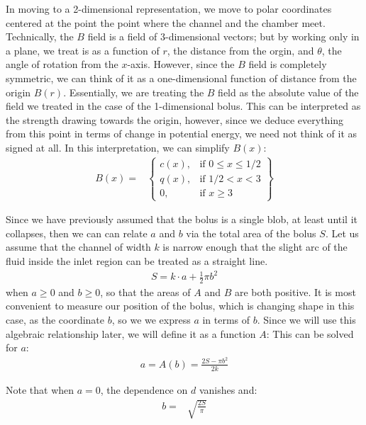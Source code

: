 \documentclass[]{asme2ej}
\begin{document}
In moving to a 2-dimensional representation, we move to polar coordinates
centered at the point the point where the channel and the chamber meet.
Technically, the $B$ field is a field of 3-dimensional vectors; but
by working only in a plane, we treat is as a function of $r$, the distance
from the orgin, and $\theta$, the angle of rotation from the $x$-axis. However,
since the $B$ field is completely symmetric, we can think of it as a one-dimensional
function of distance from the origin $B(r)$. Essentially, we are treating the
$B$ field as the absolute value of the field we treated in the case of the 1-dimensional
bolus.
This can be interpreted as the strength drawing towards the origin, however, since
we deduce everything from this point in terms of change in potential energy,
we need not think of it as signed at all.
In this interpretation, we can simplify $B(x)$:
\begin{align}
B(x) = &
\left\{
    \begin{array}{lr}
      c(x) , & \text{if } 0 \leq x \leq 1/2 \\
      q(x) , & \text{if } 1/2 < x < 3 \\
      0 , & \text{if } x \geq 3
    \end{array}
    \right\}
    \label{eq:Bfield}
\end{align}


Since we have previously assumed that the bolus is a single blob,
at least until it collapses, then we can can relate $a$ and $b$
via the total area of the bolus $S$.
Let us assume that the channel of width $k$ is narrow enough
that the slight arc of the fluid inside the inlet region can be treated as a
straight line.
\begin{align}
S = k \cdot a + \frac{1}{2} \pi b^2
\end{align}
when $a \geq 0$ and $b \geq 0$, so that the areas of $A$ and $B$ are both positive.
It is most convenient to measure our position of the bolus, which is
changing shape in this case, as the coordinate $b$, so we we express
$a$ in terms of $b$. Since we will use this algebraic relationship later, we will define it as a function $A$:
This can be solved for $a$:
\begin{align}
  a = A(b) = \frac{2S - \pi b^2}{2k}
  \label{eqn:afromS}
\end{align}


Note that when $a = 0$, the dependence on $d$ vanishes and:
\begin{align}
  b = & \sqrt{\frac{2S}{\pi}} \\
  \label{eq:maximalB}
\end{align}
\end{document}
